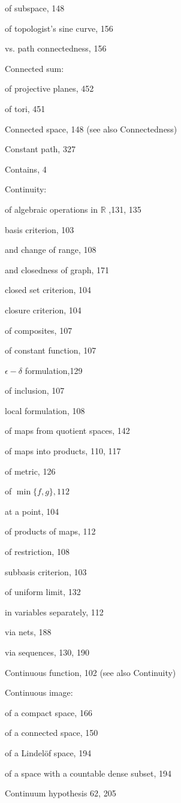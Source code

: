 of subspace, 148

of topologist's sine curve, 156

vs. path connectedness, 156

Connected sum:

of projective planes, 452

of tori, 451

Connected space, 148 (see also Connectedness)

Constant path, 327

Contains, 4

Continuity:

of algebraic operations in \(\mathbb{R}\) ,131, 135

basis criterion, 103

and change of range, 108

and closedness of graph, 171

closed set criterion, 104

closure criterion, 104

of composites, 107

of constant function, 107

\(\epsilon  - \delta\) formulation,129

of inclusion, 107

local formulation, 108

of maps from quotient spaces, 142

of maps into products, 110, 117

of metric, 126

of \(\min \{ f,g\} ,{112}\)

at a point, 104

of products of maps, 112

of restriction, 108

subbasis criterion, 103

of uniform limit, 132

in variables separately, 112

via nets, 188

via sequences, 130, 190

Continuous function, 102 (see also Continuity)

Continuous image:

of a compact space, 166

of a connected space, 150

of a Lindelöf space, 194

of a space with a countable dense subset, 194

Continuum hypothesis 62, 205

